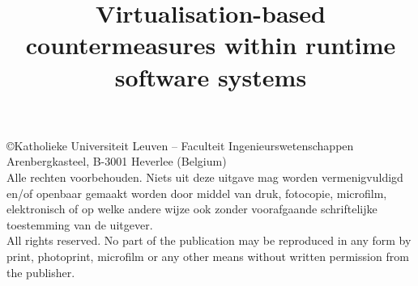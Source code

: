 %




\title{Virtualisation-based countermeasures within runtime software systems}
\sidetitle{}





\pagestyle{empty}
\newpage
\section*{}

\vspace*{13cm}

\copyright  Katholieke Universiteit Leuven -- Faculteit Ingenieurswetenschappen\\
Arenbergkasteel, B-3001 Heverlee (Belgium)\\

\noindent
Alle rechten voorbehouden. Niets uit deze uitgave mag worden
ver\-menig\-vuldigd en/of open\-baar gemaakt worden door middel van druk,
fotocopie, microfilm, elektronisch of op welke andere wijze ook zonder
voorafgaande schriftelijke toe\-stemming van de uitgever.\\

\noindent
All rights reserved. No part of the publication may be reproduced in
any form by print, photoprint, microfilm or any other means without
written permission from the publisher.

